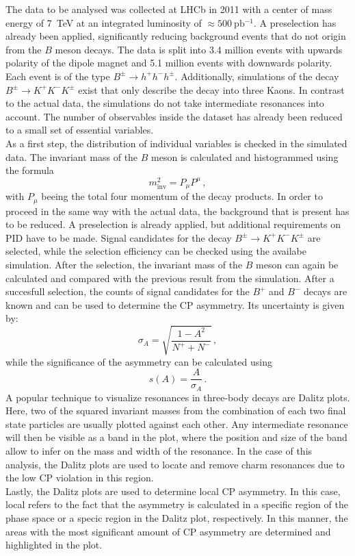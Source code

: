 The data to be analysed was collected at LHCb in 2011 with a center of mass energy of \qty{7}{\tera\electronvolt} at an integrated luminosity of $\approx \qty{500}{\pico\barn^{-1}}$.
A preselection has already been applied, significantly reducing background events that do not origin from the $B$ meson decays.
The data is split into 3.4 million events with upwards polarity of the dipole magnet and 5.1 million events with downwards polarity. Each event is of the type
$B^\pm \rightarrow h^+ h^- h^\pm$. Additionally, simulations of the decay $B^\pm \rightarrow K^+ K^- K^\pm$ exist that only describe the decay into three Kaons.
In contrast to the actual data, the simulations do not take intermediate resonances into account. The number of observables inside the dataset has already been reduced
to a small set of essential variables. \\
As a first step, the distribution of individual variables is checked in the simulated data. The invariant mass of the $B$ meson is calculated and histogrammed using the formula
\begin{equation}
	m_{\text{inv}}^2 = P_\mu P^\mu \, ,
	\label{eq:inv_mass}
\end{equation}
with $P_\mu$ beeing the total four momentum of the decay products.
In order to proceed in the same way with the actual data, the background that is present has to be reduced. A preselection is already applied, but additional requirements on PID have to be made.
Signal candidates for the decay $B^\pm \rightarrow K^+ K^- K^\pm$ are selected, while the selection efficiency can be checked using the availabe simulation.
After the selection, the invariant mass of the $B$ meson can again be calculated and compared with the previous result from the simulation.
After a succesfull selection, the counts of signal candidates for the $B^+$ and $B^-$ decays are known and can be used to determine the CP asymmetry. Its uncertainty is given by:
\begin{equation}
	\sigma_A = \sqrt{\frac{1-A^2}{N^+ + N^-}} \, ,
	\label{eq:A_error}
\end{equation}
while the significance of the asymmetry can be calculated using
\begin{equation}
	s(A) = \frac{A}{\sigma_A} \, .
	\label{eq:A_sigma}
\end{equation}
A popular technique to visualize resonances in three-body decays are Dalitz plots. Here, two of the squared invariant masses from the combination of each two final state particles
are usually plotted against each other. Any intermediate resonance will then be visible as a band in the plot, where the position and size of the band allow to infer on
the mass and width of the resonance. In the case of this analysis, the Dalitz plots are used to locate and remove charm resonances due to the low CP violation in this region.\\
Lastly, the Dalitz plots are used to determine local CP asymmetry. In this case, local refers to the fact that the asymmetry is calculated in a specific region of the phase space
or a specic region in the Dalitz plot, respectively. In this manner, the areas with the most significant amount of CP asymmetry are determined and highlighted in the plot.



